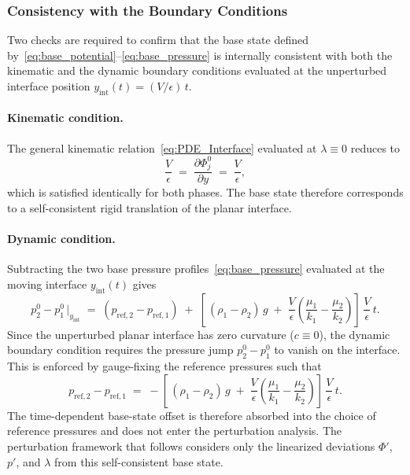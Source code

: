 \subsubsection{Consistency with the Boundary Conditions}

Two checks are required to confirm that the base state defined by~\eqref{eq:base_potential}--\eqref{eq:base_pressure} is internally consistent with both the kinematic and the dynamic boundary conditions evaluated at the unperturbed interface position $y_{\mathrm{int}}(t) = (V/\epsilon)\,t$.

\paragraph{Kinematic condition.} The general kinematic relation~\eqref{eq:PDE_Interface} evaluated at $\lambda \equiv 0$ reduces to
\begin{equation}
\frac{V}{\epsilon} \;=\; \frac{\partial \Phi_j^0}{\partial y} \;=\; \frac{V}{\epsilon},
\end{equation}
which is satisfied identically for both phases. The base state therefore corresponds to a self-consistent rigid translation of the planar interface.

\paragraph{Dynamic condition.} Subtracting the two base pressure profiles~\eqref{eq:base_pressure} evaluated at the moving interface $y_{\mathrm{int}}(t)$ gives
\begin{equation}
\label{eq:base_pressure_jump}
p_2^0 - p_1^0 \,\Big|_{y_{\mathrm{int}}}
\;=\; (p_{\mathrm{ref},2} - p_{\mathrm{ref},1})
\;+\; \left[\,(\rho_1 - \rho_2)\,g \;+\; \frac{V}{\epsilon}\!\left(\frac{\mu_1}{k_1} - \frac{\mu_2}{k_2}\right)\right]\,\frac{V}{\epsilon}\,t.
\end{equation}
Since the unperturbed planar interface has zero curvature ($c \equiv 0$), the dynamic boundary condition requires the pressure jump $p_2^0 - p_1^0$ to vanish on the interface. This is enforced by gauge-fixing the reference pressures such that
\begin{equation}
\label{eq:gauge_fixing}
p_{\mathrm{ref},2} - p_{\mathrm{ref},1}
\;=\; -\!\left[\,(\rho_1 - \rho_2)\,g \;+\; \frac{V}{\epsilon}\!\left(\frac{\mu_1}{k_1} - \frac{\mu_2}{k_2}\right)\right]\,\frac{V}{\epsilon}\,t.
\end{equation}
The time-dependent base-state offset is therefore absorbed into the choice of reference pressures and does not enter the perturbation analysis. The perturbation framework that follows considers only the linearized deviations $\Phi'$, $p'$, and $\lambda$ from this self-consistent base state.

